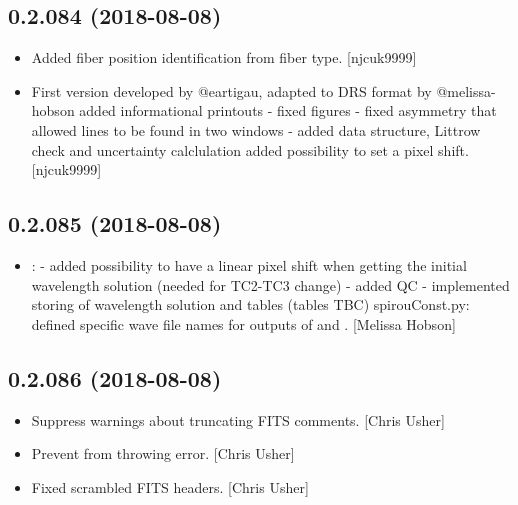 \documentclass[a4paper,10pt,english]{report}
\begin{document}
\subsection{0.2.084 (2018-08-08)}
\label{\detokenize{misc/changelog:id378}}\begin{itemize}
\item {} 
Added fiber position identification from fiber type. {[}njcuk9999{]}

\item {} 
First version  developed by @eartigau, adapted to DRS format
by @melissa-hobson added informational printouts - fixed figures -
fixed asymmetry that allowed lines to be found in two windows - added
 data structure, Littrow check and uncertainty calclulation
added possibility to set a pixel shift. {[}njcuk9999{]}

\end{itemize}


\subsection{0.2.085 (2018-08-08)}
\label{\detokenize{misc/changelog:id379}}\begin{itemize}
\item {} 
: - added possibility to have a linear pixel
shift when getting the initial wavelength solution (needed for TC2-TC3
change) - added QC - implemented storing of wavelength solution and
tables (tables TBC) spirouConst.py: defined specific wave file names
for outputs of  and .
{[}Melissa Hobson{]}

\end{itemize}


\subsection{0.2.086 (2018-08-08)}
\label{\detokenize{misc/changelog:id380}}\begin{itemize}
\item {} 
Suppress warnings about truncating FITS comments. {[}Chris Usher{]}

\item {} 
Prevent  from throwing error. {[}Chris
Usher{]}

\item {} 
Fixed scrambled FITS headers. {[}Chris Usher{]}

\end{itemize}
\end{document}
